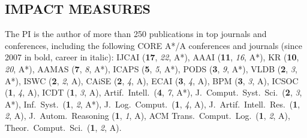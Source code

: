 
\vspace{-1ex}
\subsection*{IMPACT MEASURES}
\vspace{-1ex}
The PI is the author of more than 250 publications in top journals and conferences, including the following CORE A*/A conferences and journals (since 2007 in bold, career in italic):
IJCAI (\textbf{17}, \textit{22}, A*), 
AAAI (\textbf{11}, \textit{16}, A*), 
KR (\textbf{10}, \textit{20}, A*), 
AAMAS (\textbf{7}, \textit{8}, A*), 
ICAPS (\textbf{5}, \textit{5}, A*), 
PODS (\textbf{3}, \textit{9}, A*), 
VLDB (\textbf{2}, \textit{3}, A*),
ISWC  (\textbf{2}, \textit{2}, A),
CAiSE (\textbf{2}, \textit{4}, A), 
ECAI (\textbf{3}, \textit{4}, A),
BPM (\textbf{3}, \textit{3}, A),
ICSOC (\textbf{1}, \textit{4}, A),  
ICDT (\textbf{1}, \textit{3}, A), 
Artif.\ Intell.\ (\textbf{4}, \textit{7}, A*),
J.\ Comput.\ Syst.\ Sci.\ (\textbf{2}, \textit{3}, A*), 
Inf.\ Syst.\ (\textbf{1}, \textit{2}, A*),
J.\ Log.\ Comput.\ (\textbf{1}, \textit{4}, A),
J.\ Artif.\ Intell.\ Res.\ (\textbf{1}, \textit{2}, A),
J.\ Autom.\ Reasoning (\textbf{1}, \textit{1}, A),
ACM Trans.\ Comput.\ Log.\ (\textbf{1}, \textit{2}, A),
Theor.\ Comput.\ Sci.\ (\textbf{1}, \textit{2}, A).


